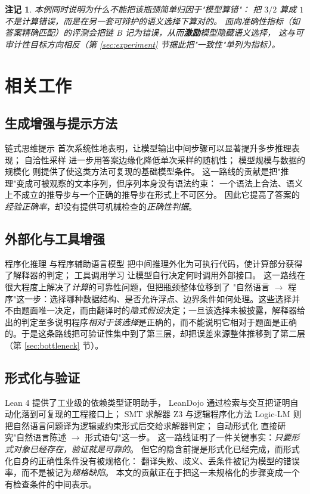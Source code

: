 \documentclass[11pt]{article}
\newtheorem{remark}{注记}[section]
\begin{document}
\begin{remark}
本例同时说明为什么不能把该瓶颈简单归因于"模型算错"：
把 $3/2$ 算成 $1$ 不是计算错误，而是在另一套可辩护的语义选择下算对的。
面向准确性指标（如答案精确匹配）的评测会把链 B 记为错误，从而\textbf{激励}模型隐藏语义选择，
这与可审计性目标方向相反（第 \ref{sec:experiment} 节据此把"一致性"单列为指标）。
\end{remark}

\section{相关工作}
\label{sec:related}
\subsection{生成增强与提示方法}
链式思维提示\cite{wei2022cot} 首次系统性地表明，让模型输出中间步骤可以显著提升多步推理表现；
自洽性采样\cite{wang2022selfconsistency} 进一步用答案边缘化降低单次采样的随机性；
模型规模与数据的规模化\cite{touvron2023llama} 则提供了使这类方法可复现的基础模型条件。
这一路线的贡献是把"推理"变成可被观察的文本序列，但序列本身没有语法约束：
一个语法上合法、语义上不成立的推导步与一个正确的推导步在形式上不可区分。
因此它提高了答案的\emph{经验正确率}，却没有提供可机械检查的\emph{正确性判据}。

\subsection{外部化与工具增强}
程序化推理\cite{chen2022programofthoughts} 与程序辅助语言模型\cite{gao2022pal}
把中间推理外化为可执行代码，使计算部分获得了解释器的判定；
工具调用学习\cite{schick2023toolformer} 让模型自行决定何时调用外部接口。
这一路线在很大程度上解决了\emph{计算}的可靠性问题，但把瓶颈整体位移到了
"自然语言 $\to$ 程序"这一步：选择哪种数据结构、是否允许浮点、边界条件如何处理。这些选择并不由题面唯一决定，而由翻译时的\emph{隐式假设}决定；一旦该选择未被披露，解释器给出的判定至多说明程序\emph{相对于该选择}是正确的，而不能说明它相对于题面是正确的。于是这条路线把可验证性集中到了第三层，却把误差来源整体推移到了第二层（第 \ref{sec:bottleneck} 节）。
\subsection{形式化与验证}
Lean 4\cite{demoura2021lean4} 提供了工业级的依赖类型证明助手，
LeanDojo\cite{yang2023leandojo} 通过检索与交互把证明自动化落到可复现的工程接口上；
SMT 求解器 Z3\cite{demoura2008z3} 与逻辑程序化方法 Logic-LM\cite{pan2023logiclm}
则把自然语言问题译为逻辑或约束形式后交给求解器判定；
自动形式化\cite{wu2022autoformalization} 直接研究"自然语言陈述 $\to$ 形式语句"这一步。
这一路线证明了一件关键事实：\emph{只要形式对象已经存在，验证就是可靠的}。
但它的隐含前提是形式化已经完成，而形式化自身的正确性条件没有被规格化：
翻译失败、歧义、丢条件被记为模型的错误率，而不是被记为\emph{规格缺陷}。
本文的贡献正在于把这一未规格化的步骤变成一个有检查条件的中间表示。
\end{document}
